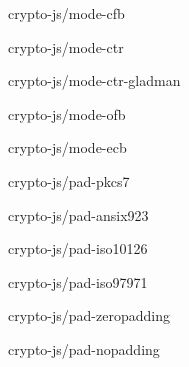 \begin{DoxyItemize}
\item {\ttfamily crypto-\/js/mode-\/cfb}
\item {\ttfamily crypto-\/js/mode-\/ctr}
\item {\ttfamily crypto-\/js/mode-\/ctr-\/gladman}
\item {\ttfamily crypto-\/js/mode-\/ofb}
\item {\ttfamily crypto-\/js/mode-\/ecb} 


\item {\ttfamily crypto-\/js/pad-\/pkcs7}
\item {\ttfamily crypto-\/js/pad-\/ansix923}
\item {\ttfamily crypto-\/js/pad-\/iso10126}
\item {\ttfamily crypto-\/js/pad-\/iso97971}
\item {\ttfamily crypto-\/js/pad-\/zeropadding}
\item {\ttfamily crypto-\/js/pad-\/nopadding} 
\end{DoxyItemize}